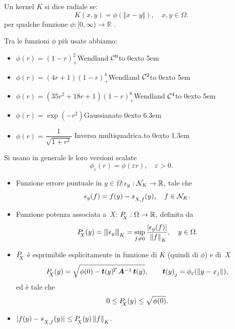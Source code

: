 \documentclass[10pt]{beamer}
\theoremstyle{definition}
\theoremstyle{plain}
\def\R{\mathbb R}
\def\Cal#1{{\cal #1}}
\def\norm#1{\Vert #1\Vert}
\def\opnorm#1{|\mskip-1.5mu|\mskip-1.5mu|#1|\mskip-1.5mu|\mskip-1.5mu|}
\def\hbyw#1#2{\vbox to #1{\vfil \hbox to #2{\hfil}}}
\def\lK{{\lower.5ex\hbox{$\scriptstyle K$}}}
\def\lX{{\!\!\lower.5ex\hbox{$\scriptstyle X$}}}
\def\lXf{{\lower.5ex\hbox{$\scriptstyle X, f$}}}
\begin{document}
\begin{frame}
Un kernel $K$ si dice \alert{radiale} se:
$$
K(x, y) = \phi(\norm{x - y}), \quad x,y\in\Omega.
$$
per qualche funzione  $\phi:[0,\infty)\to\R$ .

\medskip

Tra le funzioni $\phi$ più usate abbiamo:
\begin{itemize}
\item $\phi(r) =  (1- r)_+^2$\hfill Wendland $\Cal C^0$\hbyw{0ex}{5em}
\item $\phi(r) = (4r+1)(1- r)^4_+$\hfill Wendland $\Cal C^2$\hbyw{0ex}{5em}
\item $\phi(r) = (35r^2 +18r+1)(1- r)^6_+$\hfill Wendland $\Cal C^4$\hbyw{0ex}{5em}

\bigskip

\item $\phi(r) = \exp(-r^2)$\hfill Gaussiana\hbyw{0ex}{6.3em}
\item $\phi(r) = \dfrac1{\sqrt{1+r^2}}$ \hfill Inversa multiquadrica.\hbyw{0ex}{1.3em}
\end{itemize}

\bigskip

Si usano in generale le loro versioni scalate
$$
\phi_\varepsilon(r) = \phi(\varepsilon r), \quad \varepsilon>0.
$$

\end{frame}





\begin{frame}
\begin{itemize}
\item
Funzione \alert{errore puntuale} in $y\in\Omega$:\quad $\epsilon_y:\Cal N_K\to\R$, tale che 
$$
\epsilon_y(f) = f(y)-s_\lXf(y),\quad f\in\Cal N_K.
$$

\item
Funzione \alert{potenza} associata a~$X$: \quad $P_{\lX}:\Omega\to\R$, definita da
$$
P_\lX(y) = \opnorm{\epsilon_y}_\lK = \sup_{f\neq 0} \frac{|\epsilon_y(f)|}{\,\,\norm f_\lK}, \quad y\in\Omega.
$$

\item 
$P_\lX$ è esprimibile esplicitamente in funzione di $K$ (quindi di $\phi$) e di~$X$
$$
P_\lX(y) = \sqrt{\phi(0)-\bm t(y)^{\!T\,}\bm A^{-1}\, \bm t(y)},\qquad \bm t(y)_{\lower.4ex\hbox{$\scriptstyle j$}} = \phi_\varepsilon(\norm{y-x_j}),
$$
ed è tale che
$$
0\leq P_\lX(y)\leq\sqrt{\phi(0)}.
$$

\medskip

\item $|f(y)-s_\lXf(y)| \leq P_\lX(y)\, \norm f_\lK$.

\end{itemize}


\end{frame}
\end{document}
